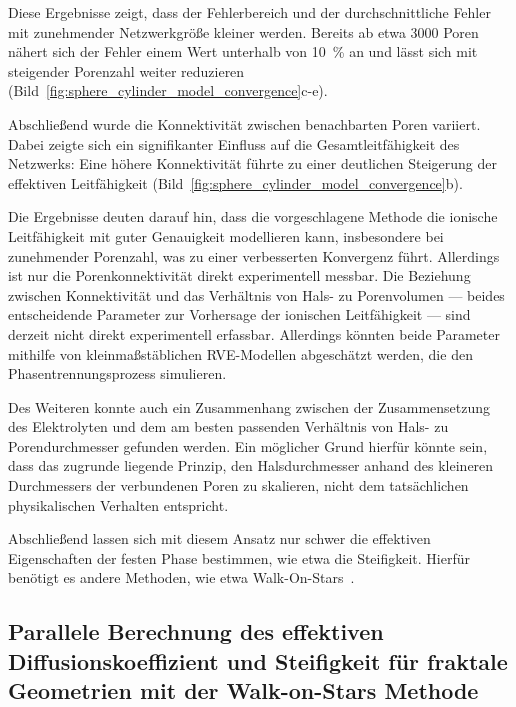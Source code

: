 Diese Ergebnisse zeigt, dass der Fehlerbereich und der durchschnittliche Fehler mit zunehmender Netzwerkgröße kleiner werden. Bereits ab etwa 3000 Poren nähert sich der Fehler einem Wert unterhalb von \SI{10}{\percent} an und lässt sich mit steigender Porenzahl weiter reduzieren (Bild~\ref{fig:sphere_cylinder_model_convergence}c-e).

Abschließend wurde die Konnektivität zwischen benachbarten Poren variiert. Dabei zeigte sich ein signifikanter Einfluss auf die Gesamtleitfähigkeit des Netzwerks: Eine höhere Konnektivität führte zu einer deutlichen Steigerung der effektiven Leitfähigkeit (Bild~\ref{fig:sphere_cylinder_model_convergence}b).

Die Ergebnisse deuten darauf hin, dass die vorgeschlagene Methode die ionische Leitfähigkeit mit guter Genauigkeit modellieren kann, insbesondere bei zunehmender Porenzahl, was zu einer verbesserten Konvergenz führt. Allerdings ist nur die Porenkonnektivität direkt experimentell messbar. Die Beziehung zwischen Konnektivität und das Verhältnis von Hals- zu Porenvolumen — beides entscheidende Parameter zur Vorhersage der ionischen Leitfähigkeit — sind derzeit nicht direkt experimentell erfassbar. 
Allerdings könnten beide Parameter mithilfe von kleinmaßstäblichen RVE-Modellen abgeschätzt werden, die den Phasentrennungsprozess simulieren. 

Des Weiteren konnte auch ein Zusammenhang zwischen der Zusammensetzung des Elektrolyten und dem am besten passenden Verhältnis von Hals- zu Porendurchmesser gefunden werden. Ein möglicher Grund hierfür könnte sein, dass das zugrunde liegende Prinzip, den Halsdurchmesser anhand des kleineren Durchmessers der verbundenen Poren zu skalieren, nicht dem tatsächlichen physikalischen Verhalten entspricht.

Abschließend lassen sich mit diesem Ansatz nur schwer die effektiven Eigenschaften der festen Phase bestimmen, wie etwa die Steifigkeit. Hierfür benötigt es andere Methoden, wie etwa Walk-On-Stars~\cite{Sawhney2023a}.


\subsection{Parallele Berechnung des effektiven Diffusionskoeffizient und Steifigkeit für fraktale Geometrien mit der Walk-on-Stars Methode}

